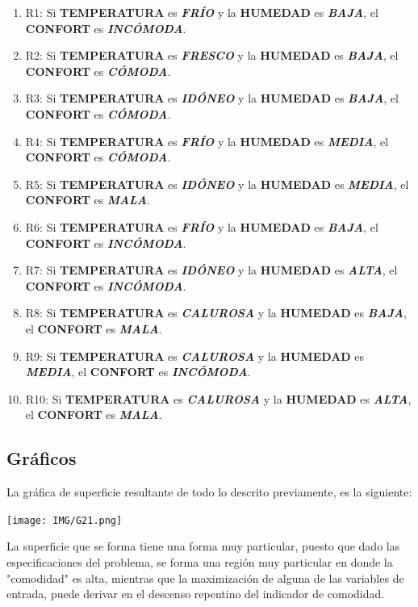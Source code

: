 \documentclass[11pt, letterpaper]{article}
\begin{document}
\begin{enumerate}
	\item R1: Si \textbf{TEMPERATURA} es \textbf{\textit{FRÍO}} y la \textbf{HUMEDAD} es \textbf{\textit{BAJA}}, el \textbf{CONFORT} es \textbf{\textit{INCÓMODA}}.
	\item R2: Si \textbf{TEMPERATURA} es \textbf{\textit{FRESCO}} y la \textbf{HUMEDAD} es \textbf{\textit{BAJA}}, el \textbf{CONFORT} es \textbf{\textit{CÓMODA}}.
	\item R3: Si \textbf{TEMPERATURA} es \textbf{\textit{IDÓNEO}} y la \textbf{HUMEDAD} es \textbf{\textit{BAJA}}, el \textbf{CONFORT} es \textbf{\textit{CÓMODA}}.
	\item R4: Si \textbf{TEMPERATURA} es \textbf{\textit{FRÍO}} y la \textbf{HUMEDAD} es \textbf{\textit{MEDIA}}, el \textbf{CONFORT} es \textbf{\textit{CÓMODA}}.
	\item R5: Si \textbf{TEMPERATURA} es \textbf{\textit{IDÓNEO}} y la \textbf{HUMEDAD} es \textbf{\textit{MEDIA}}, el \textbf{CONFORT} es \textbf{\textit{MALA}}.
	\item R6: Si \textbf{TEMPERATURA} es \textbf{\textit{FRÍO}} y la \textbf{HUMEDAD} es \textbf{\textit{BAJA}}, el \textbf{CONFORT} es \textbf{\textit{INCÓMODA}}.
	\item R7: Si \textbf{TEMPERATURA} es \textbf{\textit{IDÓNEO}} y la \textbf{HUMEDAD} es \textbf{\textit{ALTA}}, el \textbf{CONFORT} es \textbf{\textit{INCÓMODA}}.
	\item R8: Si \textbf{TEMPERATURA} es \textbf{\textit{CALUROSA}} y la \textbf{HUMEDAD} es \textbf{\textit{BAJA}}, el \textbf{CONFORT} es \textbf{\textit{MALA}}.
	\item R9: Si \textbf{TEMPERATURA} es \textbf{\textit{CALUROSA}} y la \textbf{HUMEDAD} es \textbf{\textit{MEDIA}}, el \textbf{CONFORT} es \textbf{\textit{INCÓMODA}}.
	\item R10: Si \textbf{TEMPERATURA} es \textbf{\textit{CALUROSA}} y la \textbf{HUMEDAD} es \textbf{\textit{ALTA}}, el \textbf{CONFORT} es \textbf{\textit{MALA}}.
\end{enumerate}

\subsection{Gráficos}

La gráfica de superficie resultante de todo lo descrito previamente, es la siguiente:

\texttt{[image: IMG/G21.png]}

La superficie que se forma tiene una forma muy particular, puesto que dado las especificaciones del problema, se forma una región muy particular en donde la "comodidad" es alta, mientras que la maximización de alguna de las variables de entrada, puede derivar en el descenso repentino del indicador de comodidad.
\end{document}
